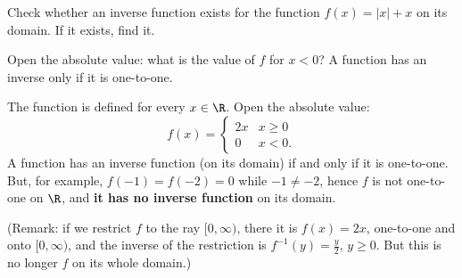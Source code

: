 
\begin{question}
Check whether an inverse function exists for the function $f(x)=|x|+x$ on its domain. If it exists, find it.
\end{question}

\begin{hint}
Open the absolute value: what is the value of $f$ for $x<0$? A function has an inverse only if it is one-to-one.
\end{hint}

\begin{solution}
The function is defined for every $x\in\R$. Open the absolute value:
\[ f(x)=\begin{cases} 2x & x\ge 0\\ 0 & x<0.\end{cases} \]
A function has an inverse function (on its domain) if and only if it is one-to-one. But, for example, $f(-1)=f(-2)=0$ while $-1\neq -2$, hence $f$ is not one-to-one on $\R$, and \textbf{it has no inverse function} on its domain.

(Remark: if we restrict $f$ to the ray $[0,\infty)$, there it is $f(x)=2x$, one-to-one and onto $[0,\infty)$, and the inverse of the restriction is $f^{-1}(y)=\frac{y}{2}$, $y\ge 0$. But this is no longer $f$ on its whole domain.)
\end{solution}
